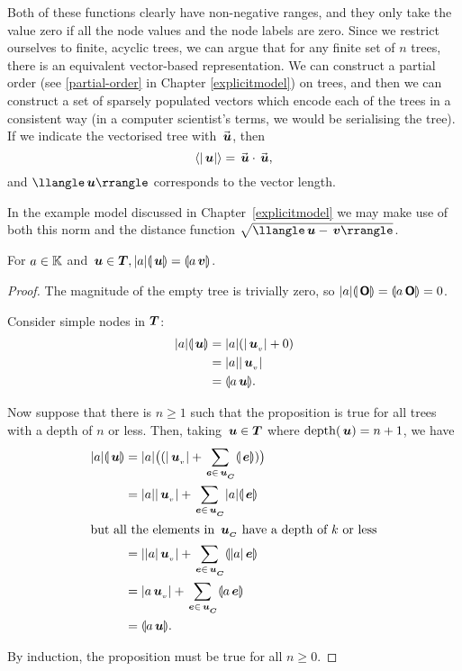 Both of these functions clearly have non-negative ranges, and they
only take the value zero if all the node values and the node labels
are zero.  Since we restrict ourselves to finite, acyclic trees, we
can argue that for any finite set of $n$ trees, there is an equivalent
vector-based representation. We can construct a partial order
(see \ref{partial-order} in Chapter \ref{explicitmodel}) on trees, and
then we can construct a set of sparsely populated vectors which encode
each of the trees in a consistent way (in a computer scientist's
terms, we would be serialising the tree). If we indicate the vectorised
tree  with $\vec{\,\boldsymbol{u}}$, then
\[\langle\rvert{\,\boldsymbol{u}}\lvert\rangle=\vec{\,\boldsymbol{u}}\cdot\vec{\,\boldsymbol{u}},\] and
$\nnorm{\node{u}}$ corresponds to the vector length.

In the example model discussed in Chapter~\ref{explicitmodel} we may
make use of both this norm and the distance function
$\sqrt{\nnorm{\node{u}-\node{v}}}$.






\begin{proposition}\label{absolutehomogeneity}
  For \(a \in \mathbb{K}\) and \(\,\boldsymbol{u} \in \boldsymbol{T}, \lvert{a}\rvert\llparenthesis{\,\boldsymbol{u}}\rrparenthesis =
  \llparenthesis{a \,\boldsymbol{v}}\rrparenthesis\).
\begin{proof}
  The magnitude of the empty tree is trivially zero, so \(\lvert{a}\rvert\llparenthesis{\,\boldsymbol{\mathsf{O}}}\rrparenthesis =
  \llparenthesis{a\,\boldsymbol{\mathsf{O}}}\rrparenthesis = 0\).

  Consider simple nodes in $\boldsymbol{T}$:
  \begin{align*}
      \lvert{a}\rvert\llparenthesis{\,\boldsymbol{u}}\rrparenthesis &= \lvert{a}\rvert(\lvert{{\,\boldsymbol{u}}_{{}_{v}}}\rvert + 0) \\
      &= \lvert{a}\rvert\lvert{{\,\boldsymbol{u}}_{{}_{v}}}\rvert \\
      &= \llparenthesis{a \,\boldsymbol{u}}\rrparenthesis.
  \end{align*}

  Now suppose that there is \(n \ge 1\) such that the proposition is true for
  all trees with a depth of \(n\) or less. Then, taking \(\,\boldsymbol{u} \in
  \boldsymbol{T}\) where \(\operatorname{depth}(\,\boldsymbol{u}) = n+1\), we have
  \begin{align*}
      \lvert{a}\rvert\llparenthesis{\,\boldsymbol{u}}\rrparenthesis &= \lvert{a}\rvert\bigl((\lvert{{\,\boldsymbol{u}}_{{}_{v}}}\rvert + \sum_{\,\boldsymbol{e}\in{\,\boldsymbol{u}}_{{}_{\boldsymbol{C}}}}\llparenthesis{\,\boldsymbol{e}}\rrparenthesis)\bigr) \\
      &= \lvert{a}\rvert\lvert{{\,\boldsymbol{u}}_{{}_{v}}}\rvert + \sum_{\,\boldsymbol{e}\in{\,\boldsymbol{u}}_{{}_{\boldsymbol{C}}}}\lvert{a}\rvert\llparenthesis{\,\boldsymbol{e}}\rrparenthesis\\
      \intertext{but all the elements in \({\,\boldsymbol{u}}_{{}_{\boldsymbol{C}}}\) have a depth of \(k\) or less}
      &= \lvert{\lvert{a}\rvert{\,\boldsymbol{u}}_{{}_{v}}}\rvert + \sum_{\,\boldsymbol{e}\in{\,\boldsymbol{u}}_{{}_{\boldsymbol{C}}}}\llparenthesis{\lvert{a}\rvert\,\boldsymbol{e}}\rrparenthesis \\
      &= \lvert{a{\,\boldsymbol{u}}_{{}_{v}}}\rvert + \sum_{\,\boldsymbol{e}\in{\,\boldsymbol{u}}_{{}_{\boldsymbol{C}}}}\llparenthesis{a \,\boldsymbol{e}}\rrparenthesis \\
      &= \llparenthesis{a \,\boldsymbol{u}}\rrparenthesis.
  \end{align*}

  By induction, the proposition must be true for all \(n \geq 0\).
\end{proof}
\end{proposition}


